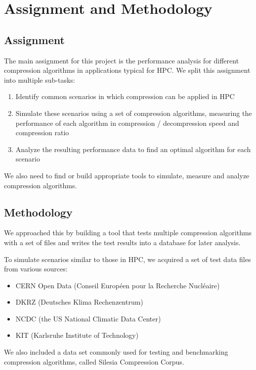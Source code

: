 \documentclass[
	12pt,
	a4paper,
	BCOR10mm,
	DIV14,
	listof=totoc,
	bibliography=totoc,
	headsepline
]{scrreprt}
\begin{document}
\chapter{Assignment and Methodology}
\label{Assignment and Methodology}
\section*{Assignment}
The main assignment for this project is the performance analysis for different compression algorithms in applications typical for HPC. We split this assignment into multiple sub-tasks:

\begin{enumerate}
\item Identify common scenarios in which compression can be applied in HPC
\item Simulate these scenarios using a set of compression algorithms, measuring the performance of each algorithm in compression / decompression speed and compression ratio
\item Analyze the resulting performance data to find an optimal algorithm for each scenario
\end{enumerate}

We also need to find or build appropriate tools to simulate, measure and analyze compression algorithms.


\section*{Methodology}
We approached this by building a tool that tests multiple compression algorithms with a set of files and writes the test results into a database for later analysis.

To simulate scenarios similar to those in HPC, we acquired a set of test data files from various sources:
\begin{itemize}
\item CERN Open Data (Conseil Européen pour la Recherche Nucléaire)
\item DKRZ (Deutsches Klima Rechenzentrum)
\item NCDC (the US National Climatic Data Center)
\item KIT (Karlsruhe Institute of Technology)
\end{itemize}

We also included a data set commonly used for testing and benchmarking compression algorithms, called Silesia Compression Corpus.
\end{document}

